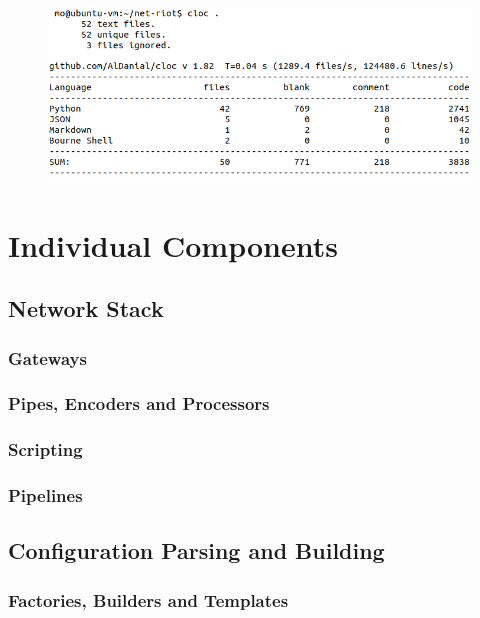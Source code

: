 \begin{figure}[h]
    \centering
    \includegraphics[width=12cm]{img/ch06/cloc.png}
    \label{fig:cloc}
\end{figure}


\section{Individual Components}
\label{sec:individual-components}

\subsection{Network Stack}
\subsubsection{Gateways}
\subsubsection{Pipes, Encoders and Processors}
\subsubsection{Scripting}
\subsubsection{Pipelines}

\subsection{Configuration Parsing and Building}
\subsubsection{Factories, Builders and Templates}